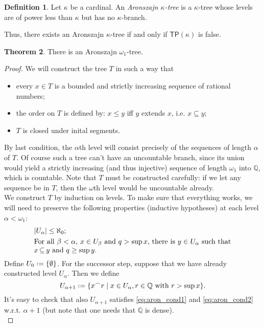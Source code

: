\documentclass[12pt,a4paper]{report}
\theoremstyle{definition}
\newtheorem{theorem}{Theorem}[chapter] %
\newtheorem{defn}[theorem]{Definition}
\theoremstyle{num.custom-title}
\DeclareMathOperator{\sse}{\subseteq}
\newcommand{\TP}{\ensuremath{\mathsf{TP}}\xspace}
\newcommand{\Q}{\mathbb{Q}}
\newcommand{\conc}{^\frown}
\newcommand*{\defeq}{\mathrel{\rlap{%
                     \raisebox{0.3ex}{$\cdot$}}%
                     \raisebox{-0.3ex}{$\cdot$}}%
                     =}
\begin{document}
\begin{defn}
Let $\kappa$ be a cardinal. An \emph{Aronszajn $\kappa$-tree} is a $\kappa$-tree whose levels are of power less than $\kappa$ but has no $\kappa$-branch.
\end{defn}
%
Thus, there exists an Aronszajn $\kappa$-tree if and only if $\TP(\kappa)$ is false.

\begin{theorem}\label{thm-aronszjan}
There is an Aronszajn $\omega_1$-tree.
\begin{proof}
We will construct the tree $T$ in such a way that

\begin{itemize}
\item every $x \in T$ is a bounded and strictly increasing sequence of rational numbers;
\item the order on $T$ is defined by: $x \leq y$ iff $y$ extends $x$, i.e. $x \sse y$;
\item $T$ is closed under inital segments.
\end{itemize}
%
By last condition, the $\alpha$th level will consist precisely of the sequences of length $\alpha$ of $T$. Of course such a tree can't have an uncountable branch, since its union would yield a strictly increasing (and thus injective) sequence of length $\omega_1$ into $\Q$, which is countable. Note that $T$ must be constructed carefully: if we let any sequence be in $T$, then the $\omega$th level would be uncountable already.\\
We construct $T$ by induction on levels. To make sure that everything works, we will need to preserve the following properties (inductive hypotheses) at each level $\alpha<\omega_1$:
%
\begin{align}
\label{eq:aron_cond1}
\begin{minipage}[t]{0.8\textwidth}
$|U_\alpha| \leq \aleph_0$;
\end{minipage}
\\
\label{eq:aron_cond2}
\begin{minipage}[t]{0.8\textwidth}
For all $\beta < \alpha$, $x \in U_\beta$ and $q > \sup x$, there is $y \in U_\alpha$ such that $x \sse y$ and $q \geq \sup y$.
\end{minipage}
\end{align}
%
Define $U_0 \defeq \{\emptyset\}$. For the successor step, suppose that we have already constructed level $U_\alpha$. Then we define
\[
U_{\alpha+1} \defeq \{ x \conc r \mid x \in U_\alpha, r \in \Q \text{ with } r > \sup x \}.
\]
It's easy to check that also $U_{\alpha+1}$ satisfies \eqref{eq:aron_cond1} and \eqref{eq:aron_cond2} w.r.t. $\alpha+1$ (but note that one needs that $\Q$ is dense).\\

\end{proof}
\end{theorem}
\end{document}
